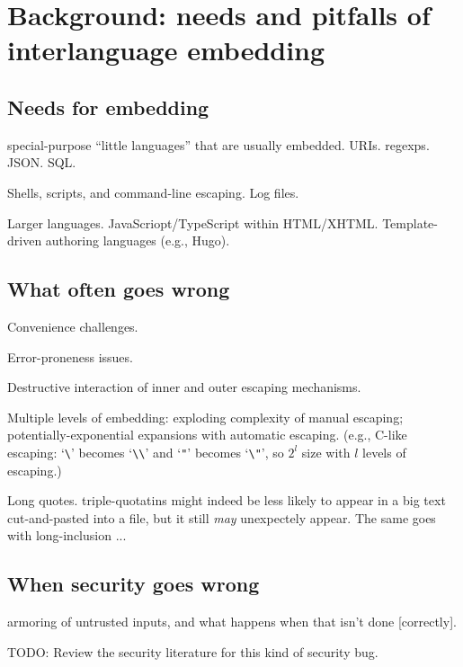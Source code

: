 \section{Background: needs and pitfalls of interlanguage embedding}
\label{sec:bg}

\subsection{Needs for embedding}

special-purpose ``little languages'' that are usually embedded.
URIs. regexps. JSON. SQL.

Shells, scripts, and command-line escaping.
Log files.

Larger languages.  JavaScriopt/TypeScript within HTML/XHTML.
Template-driven authoring languages (e.g., Hugo).

\subsection{What often goes wrong}

Convenience challenges.

Error-proneness issues.

Destructive interaction of inner and outer escaping mechanisms.

Multiple levels of embedding: exploding complexity of manual escaping;
potentially-exponential expansions with automatic escaping.
(e.g., C-like escaping: `\verb|\|' becomes `\verb|\\|'
and `\verb|"|' becomes `\verb|\"|',
so $2^l$ size with $l$ levels of escaping.)


Long quotes.  
triple-quotatins might indeed be less likely to appear
in a big text cut-and-pasted into a file,
but it still \emph{may} unexpectely appear.
The same goes with long-inclusion ...

\subsection{When security goes wrong}

armoring of untrusted inputs,
and what happens when that isn't done [correctly].

TODO: Review the security literature for this kind of security bug.

